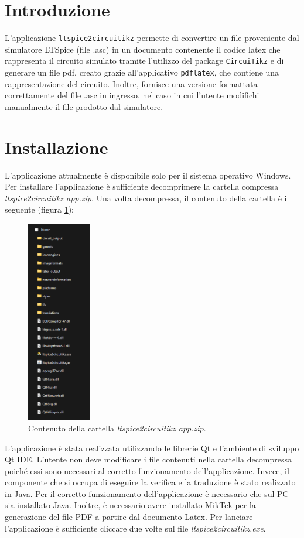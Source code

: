 \section{Introduzione}
L'applicazione \texttt{ltspice2circuitikz} permette di convertire un file proveniente dal simulatore LTSpice (file .asc) in un documento contenente il codice latex che rappresenta il circuito simulato tramite l'utilizzo del package \texttt{CircuiTikz} e di generare un file pdf, creato grazie all'applicativo \texttt{pdflatex}, che contiene una rappresentazione del circuito. Inoltre, fornisce una versione formattata correttamente del file .asc in ingresso, nel caso in cui l'utente modifichi manualmente il file prodotto dal simulatore.
\section{Installazione}
L'applicazione attualmente è disponibile solo per il sistema operativo Windows. Per installare l'applicazione è sufficiente decomprimere la cartella compressa \textit{ltspice2circuitikz app.zip}. Una volta decompressa, il contenuto della cartella è il seguente (figura \ref{fig:contenuto}):
\begin{figure}[h!]
	\centering
	\includegraphics[width=0.25\textwidth]{./ImageFiles/contenuto.png}
	\caption{Contenuto della cartella \textit{ltspice2circuitikz app.zip}.}
	\label{fig:contenuto}
\end{figure}

\noindent
L'applicazione è stata realizzata utilizzando le librerie Qt e l'ambiente di sviluppo Qt IDE. L'utente non deve modificare i file contenuti nella cartella decompressa poiché essi sono necessari al corretto funzionamento dell'applicazione. Invece, il componente che si occupa di eseguire la verifica e la traduzione è stato realizzato in Java. Per il corretto funzionamento dell'applicazione è necessario che sul PC sia installato Java. Inoltre, è necessario avere installato MikTek per la generazione del file PDF a partire dal documento Latex. Per lanciare l'applicazione è sufficiente cliccare due volte sul file \textit{ltspice2circuitikz.exe}.
